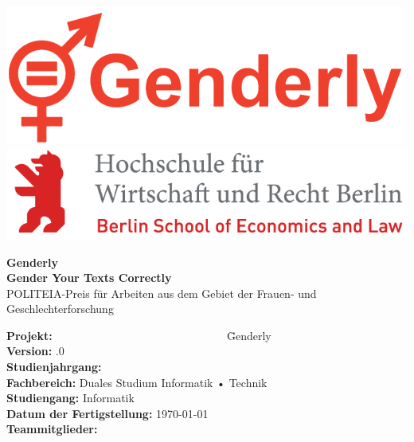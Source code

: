\includegraphics[scale=0.4]{Bilder/Logos/Genderly_Logo.png}
\hfill
\includegraphics[scale=1]
{Bilder/Logos/HWR_Logo_farbig.jpg}

\begin{center}
	\vspace{1cm}
	\Huge{\textbf{Genderly \\ Gender Your Texts Correctly}}\\
	\vspace{1cm}
	\Large{POLITEIA-Preis für Arbeiten aus dem Gebiet der Frauen- und Geschlechterforschung}\\
	\vspace{1cm}
\end{center}{\huge \par}

\begin{doublespacing}
	\begin{large}
		\begin{tabbing}
			
			\textbf{Projekt:} ~~~~~~~~~~~~~~~~~~~~~~~~~~~~~~ \= Genderly \\
			\textbf{Version:} .0 \\
			\textbf{Studienjahrgang:} \\
			\textbf{Fachbereich:} \> Duales Studium Informatik • Technik \\
			\textbf{Studiengang:} \> Informatik \\
			\textbf{Datum der Fertigstellung:} \> \today \\
			\textbf{Teammitglieder:} \>  \\
			
		\end{tabbing}
	\end{large}
\end{doublespacing}

